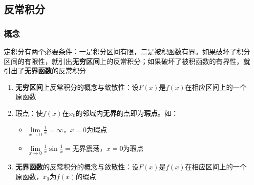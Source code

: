 \documentclass[a4paper,12pt]{article}
\begin{document}
    \subsection{反常积分}

    \subsubsection{概念}

    定积分有两个必要条件：一是积分区间有限，二是被积函数有界。如果破坏了积分区间的有限性，就引出\textbf{无穷区间}上的反常积分；如果破坏了被积函数的有界性，就引出了\textbf{无界函数}的反常积分

    \begin{enumerate}
        \item \textbf{无穷区间}上反常积分的概念与敛散性：设$F(x)$是$f(x)$在相应区间上的一个原函数
        \item 瑕点：使$f(x)$在$x_0$的邻域内\textbf{无界}的点即为\textbf{瑕点}。如：
        \begin{itemize}
            \item $\lim\limits_{x\to 0} \displaystyle\frac{1}{x} = \infty$，$x = 0$为瑕点
            \item $\lim\limits_{x\to 0} \displaystyle\frac{1}{x} \sin \displaystyle\frac{1}{x} = \text{无界震荡}$，$x = 0$为瑕点
        \end{itemize}
        \item \textbf{无界函数}的反常积分的概念与敛散性：设$F(x)$是$f(x)$在相应区间上的一个原函数，$x_0$为$f(x)$的瑕点
\end{enumerate}
\end{document}
